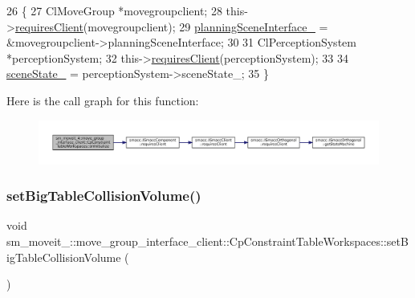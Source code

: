 \begin{DoxyCode}
26         \{
27             ClMoveGroup *movegroupclient;
28             this->\hyperlink{classsmacc_1_1ISmaccComponent_a36c085d906fbae0fcaee817aaeafebf4}{requiresClient}(movegroupclient);
29             \hyperlink{classsm__moveit__4_1_1move__group__interface__client_1_1CpConstraintTableWorkspaces_a03f866282a64d14a33d180a53e43d850}{planningSceneInterface\_} = &movegroupclient->planningSceneInterface;
30 
31             ClPerceptionSystem *perceptionSystem;
32             this->\hyperlink{classsmacc_1_1ISmaccComponent_a36c085d906fbae0fcaee817aaeafebf4}{requiresClient}(perceptionSystem);
33 
34             \hyperlink{classsm__moveit__4_1_1move__group__interface__client_1_1CpConstraintTableWorkspaces_aee8b5f525a640819e13271dc68f5d4e2}{sceneState\_} = perceptionSystem->sceneState\_;
35         \}
\end{DoxyCode}
Here is the call graph for this function\+:
\nopagebreak
\begin{figure}[H]
\begin{center}
\leavevmode
\includegraphics[width=350pt]{classsm__moveit__4_1_1move__group__interface__client_1_1CpConstraintTableWorkspaces_a0c9f51a8752aac05a6d2f1e00d06a34e_cgraph}
\end{center}
\end{figure}
\mbox{\label{classsm__moveit__4_1_1move__group__interface__client_1_1CpConstraintTableWorkspaces_a6f957ed21a9ea01327d3c7c4ebbebe81}} 
\subsubsection{\texorpdfstring{set\+Big\+Table\+Collision\+Volume()}{setBigTableCollisionVolume()}}
{\footnotesize\ttfamily void sm\+\_\+moveit\+\_\+::move\+\_\+group\+\_\+interface\+\_\+client\+::\+Cp\+Constraint\+Table\+Workspaces\+::set\+Big\+Table\+Collision\+Volume (\begin{DoxyParamCaption}{ }\end{DoxyParamCaption})}



